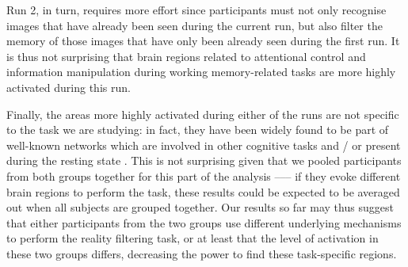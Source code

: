 Run 2, in turn, requires more effort since participants must not only recognise  images that have already been seen during the current run, but also filter the memory of those images that have only been already seen during the first run. It is thus not surprising that brain regions related to attentional control and information manipulation during working memory-related tasks \citep{Koenigs2009, Wu2016} are more highly activated during this run. 

Finally, the areas more highly activated during either of the runs are not specific to the task we are studying: in fact, they have been widely found to be part of well-known networks which are involved in other cognitive tasks and / or present during the resting state \citep{VandenHeuvel2010a}. This is not surprising given that we pooled participants from both groups together for this part of the analysis ––– if they evoke different brain regions to perform the task, these results could be expected to be averaged out when all subjects are grouped together. Our results so far may thus suggest that either participants from the two groups use different underlying mechanisms to perform the reality filtering task, or at least that the level of activation in these two groups differs, decreasing the power to find these task-specific regions.

